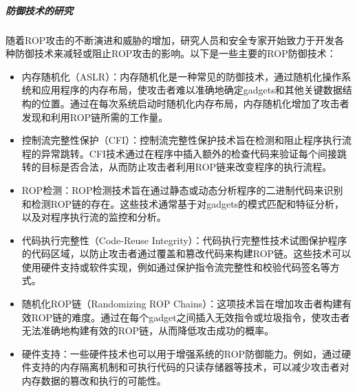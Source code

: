 \documentclass[UTF8,12pt,a4paper]{ctexart}
\numberwithin{figure}{section}
\begin{document}
\subparagraph{防御技术的研究}
\par 随着ROP攻击的不断演进和威胁的增加，研究人员和安全专家开始致力于开发各种防御技术来减轻或阻止ROP攻击的影响。以下是一些主要的ROP防御技术：
\begin{itemize}
    \item 内存随机化（ASLR）：内存随机化是一种常见的防御技术，通过随机化操作系统和应用程序的内存布局，使攻击者难以准确地确定gadgets和其他关键数据结构的位置。通过在每次系统启动时随机化内存布局，内存随机化增加了攻击者发现和利用ROP链所需的工作量。
    \item 控制流完整性保护（CFI）：控制流完整性保护技术旨在检测和阻止程序执行流程的异常跳转。CFI技术通过在程序中插入额外的检查代码来验证每个间接跳转的目标是否合法，从而防止攻击者利用ROP链来改变程序的执行流程。
    \item ROP检测：ROP检测技术旨在通过静态或动态分析程序的二进制代码来识别和检测ROP链的存在。这些技术通常基于对gadgets的模式匹配和特征分析，以及对程序执行流的监控和分析。
    \item 代码执行完整性（Code-Reuse Integrity）：代码执行完整性技术试图保护程序的代码区域，以防止攻击者通过覆盖和篡改代码来构建ROP链。这些技术可以使用硬件支持或软件实现，例如通过保护指令流完整性和校验代码签名等方式。
    \item 随机化ROP链（Randomizing ROP Chains）：这项技术旨在增加攻击者构建有效ROP链的难度。通过在每个gadget之间插入无效指令或垃圾指令，使攻击者无法准确地构建有效的ROP链，从而降低攻击成功的概率。
    \item 硬件支持：一些硬件技术也可以用于增强系统的ROP防御能力。例如，通过硬件支持的内存隔离机制和可执行代码的只读存储器等技术，可以减少攻击者对内存数据的篡改和执行的可能性。
\end{itemize}
\end{document}
